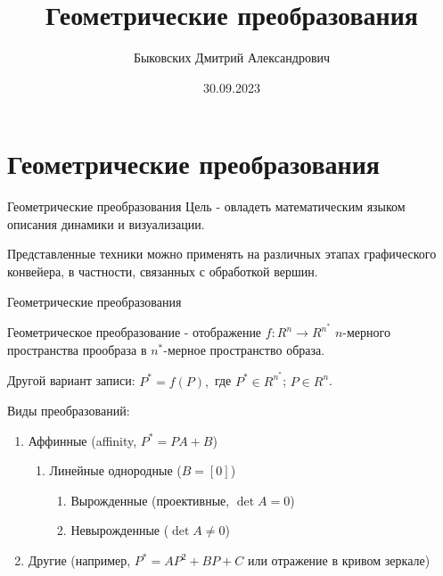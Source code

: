 \documentclass{beamer}
\title[Геометрические преобразования]{Геометрические преобразования}
\author[Быковских Д.А.]{Быковских Дмитрий Александрович}
\date{30.09.2023}
\begin{document}
	\begin{frame}
		\titlepage
	\end{frame}

	\section{Геометрические преобразования}

	\begin{frame}{Геометрические преобразования}
		Цель - овладеть математическим языком описания динамики и визуализации.

		Представленные техники можно применять на различных этапах графического конвейера, в частности, связанных с обработкой вершин.
	\end{frame}

	\begin{frame}{Геометрические преобразования}
				
		Геометрическое преобразование - отображение $f:R^n \to R^{n^{*}}$ $n$-мерного пространства прообраза в $n^{*}$-мерное пространство образа.

		Другой вариант записи:	
		$
			P^{*}=f(P)
			,
		$
		где 
		$P^{*} \in R^{n^{*}}$;
		$P \in R^n $.
		
		Виды преобразований:
		\begin{enumerate}
			\item Аффинные (affinity, $P^{*} = P  A+B$)
				\begin{enumerate}
					\item Линейные однородные ($B = [0]$)
					\begin{enumerate}
						\item Вырожденные (проективные, $\det{A} = 0$)
						\item Невырожденные ($\det{A}\neq 0$)
					\end{enumerate}
				\end{enumerate}
			\item Другие (например, $P^{*}=A P^2+B P+ C$ или отражение в кривом зеркале)
		\end{enumerate}

\end{frame}
\end{document}
